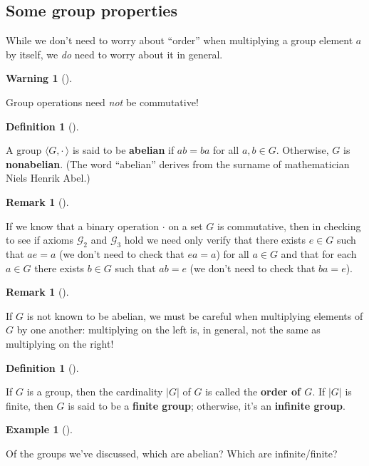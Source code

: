 \documentclass[10pt,]{book}
\newcommand{\terminology}[1]{\textbf{#1}}
\theoremstyle{plain}
\theoremstyle{definition}
\newtheorem{definition}[theorem]{Definition}
\theoremstyle{definition}
\newtheorem{remark}[theorem]{Remark}
\newtheorem{warning}[theorem]{Warning}
\theoremstyle{definition}
\newtheorem{example}[theorem]{Example}
\theoremstyle{definition}
\numberwithin{equation}{section}
\def\G{\mathcal{G}}
\begin{document}
\subsection[{Some group properties}]{Some group properties}\label{subsection-2}

      While we don't need to worry about ``order'' when multiplying a group element \(a\) by itself, we \emph{do} need to worry about it in general.
\begin{warning}[]\label{warning-8}

        Group operations need \emph{not} be commutative!
\end{warning}
\begin{definition}[{}]\label{definition-20}

          A group \(\langle G, \cdot\,\rangle\) is said to be \terminology{abelian} if \(ab=ba\) for all \(a,b\in
          G\). Otherwise, \(G\) is \terminology{nonabelian}. (The word ``abelian'' derives from the surname of
          mathematician Niels Henrik Abel.)
\end{definition}
\begin{remark}[]\label{remark-10}

        If we know that a binary operation \(\cdot\)
        on a set \(G\) is commutative, then in checking to see if axioms
        \(\G_2\) and \(\G_3\) hold we need only verify that there exists
        \(e\in G\) such that \(ae=a\) (we don't need to check that
        \(ea=a\)) for all \(a\in G\) and that for each \(a\in G\) there
        exists \(b\in G\) such that \(ab=e\) (we don't need to check that
        \(ba=e\)).
\end{remark}
\begin{remark}[]\label{remark-11}

        If \(G\) is not known to be abelian, we
        must be careful when multiplying elements of \(G\) by one
        another: multiplying on the left is, in general, not the same
        as multiplying on the right!
\end{remark}
\begin{definition}[{}]\label{definition-21}

          If \(G\) is a group, then the cardinality \(|G|\) of \(G\) is
          called the \terminology{order of \(G\)}. If \(|G|\) is finite, then \(G\) is
          said to be a \terminology{finite group}; otherwise, it's an \terminology{infinite group}.
\end{definition}
\begin{example}[]\label{example-15}

          Of the groups we've discussed, which are abelian? Which are infinite/finite?
\end{example}
\par
\end{document}
